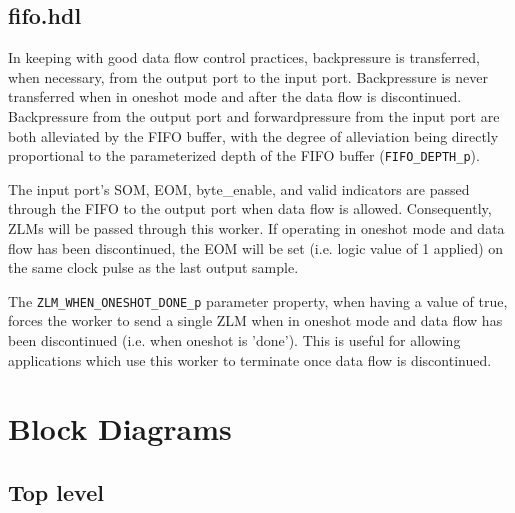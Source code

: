 \documentclass{article}
\def\comp{fifo}
\def\Comp{FIFO}
\begin{document}
\subsection*{\comp.hdl}
\begin{flushleft}
  In keeping with good data flow control practices, backpressure is transferred, when necessary, from the output port to the input port. Backpressure is never transferred when in oneshot mode and after the data flow is discontinued. Backpressure from the output port and forwardpressure from the input port are both alleviated by the FIFO buffer, with the degree of alleviation being directly proportional to the parameterized depth of the FIFO buffer (\verb+FIFO_DEPTH_p+).\medskip

  The input port's SOM, EOM, byte\_enable, and valid indicators are passed through the FIFO to the output port when data flow is allowed. Consequently, ZLMs will be passed through this worker. If operating in oneshot mode and data flow has been discontinued, the EOM will be set (i.e. logic value of 1 applied) on the same clock pulse as the last output sample.\medskip

  The \verb+ZLM_WHEN_ONESHOT_DONE_p+ parameter property, when having a value of true, forces the worker to send a single ZLM when in oneshot mode and data flow has been discontinued (i.e. when oneshot is 'done'). This is useful for allowing applications which use this worker to terminate once data flow is discontinued.
\end{flushleft}

\section*{Block Diagrams}
\subsection*{Top level}
\begin{center}
\end{center}
\end{document}
